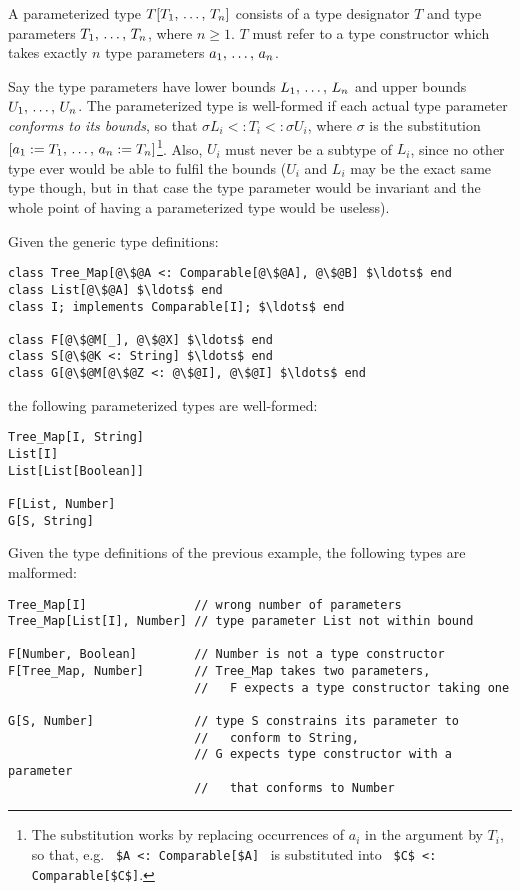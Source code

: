 A parameterized type $T[T_1 ,\, \ldots ,\, T_n]$ consists of a type designator $T$ and type parameters $T_1 ,\, \ldots ,\, T_n$, where $n \geq 1$. $T$ must refer to a type constructor which takes exactly $n$ type parameters $a_1 ,\, \ldots ,\, a_n$. 

Say the type parameters have lower bounds $L_1 ,\, \ldots ,\, L_n$ and upper bounds $U_1 ,\, \ldots ,\, U_n$. The parameterized type is well-formed if each actual type parameter {\em conforms to its bounds}, so that $\sigma L_i <: T_i <: \sigma U_i$, where $\sigma$ is the substitution $[a_1 := T_1 ,\, \ldots ,\, a_n := T_n]$\footnote{The substitution works by replacing occurrences of $a_i$ in the argument by $T_i$, so that, e.g. ~\lstinline[mathescape=false]!$A <: Comparable[$A]!~ is substituted into ~\lstinline!$C$ <: Comparable[$C$]!.}. Also, $U_i$ must never be a subtype of $L_i$, since no other type ever would be able to fulfil the bounds ($U_i$ and $L_i$ may be the exact same type though, but in that case the type parameter would be invariant and the whole point of having a parameterized type would be useless). 

\example
\label{example:parameterized-types}
Given the generic type definitions: 

\begin{lstlisting}[escapechar=@]
class Tree_Map[@\$@A <: Comparable[@\$@A], @\$@B] $\ldots$ end
class List[@\$@A] $\ldots$ end
class I; implements Comparable[I]; $\ldots$ end

class F[@\$@M[_], @\$@X] $\ldots$ end
class S[@\$@K <: String] $\ldots$ end
class G[@\$@M[@\$@Z <: @\$@I], @\$@I] $\ldots$ end
\end{lstlisting}

the following parameterized types are well-formed: 

\begin{lstlisting}
Tree_Map[I, String]
List[I]
List[List[Boolean]]

F[List, Number]
G[S, String]
\end{lstlisting}

\example
\label{example:parameterized-types-mal}

Given the type definitions of the previous example, the following types are malformed: 

\begin{lstlisting}
Tree_Map[I]               // wrong number of parameters
Tree_Map[List[I], Number] // type parameter List not within bound

F[Number, Boolean]        // Number is not a type constructor
F[Tree_Map, Number]       // Tree_Map takes two parameters, 
                          //   F expects a type constructor taking one

G[S, Number]              // type S constrains its parameter to
                          //   conform to String, 
                          // G expects type constructor with a parameter
                          //   that conforms to Number
\end{lstlisting}





